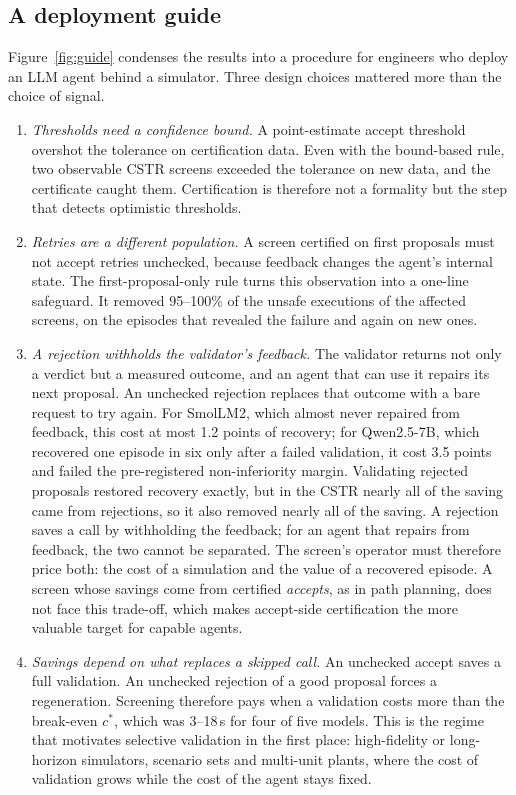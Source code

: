 \subsection{A deployment guide}
Figure~\ref{fig:guide} condenses the results into a procedure for engineers who deploy an LLM agent behind a
simulator. Three design choices mattered more than the choice of signal.
\begin{enumerate}
\item \emph{Thresholds need a confidence bound.} A point-estimate accept threshold overshot the tolerance on
certification data. Even with the bound-based rule, two observable CSTR screens exceeded the tolerance on new
data, and the certificate caught them. Certification is therefore not a formality but the step that detects
optimistic thresholds.
\item \emph{Retries are a different population.} A screen certified on first proposals must not accept retries
unchecked, because feedback changes the agent's internal state. The first-proposal-only rule turns this
observation into a one-line safeguard. It removed 95--100\% of the unsafe executions of the affected screens,
on the episodes that revealed the failure and again on new ones.
\item \emph{A rejection withholds the validator's feedback.} The validator returns not only a verdict but a measured
outcome, and an agent that can use it repairs its next proposal. An unchecked rejection replaces that outcome with
a bare request to try again. For SmolLM2, which almost never repaired from feedback, this cost at most 1.2 points
of recovery; for Qwen2.5-7B, which recovered one episode in six only after a failed validation, it cost 3.5 points
and failed the pre-registered non-inferiority margin. Validating rejected proposals restored recovery exactly, but
in the CSTR nearly all of the saving came from rejections, so it also removed nearly all of the saving. A rejection
saves a call by withholding the feedback; for an agent that repairs from feedback, the two cannot be separated. The
screen's operator must therefore price both: the cost of a simulation and the value of a recovered episode. A
screen whose savings come from certified \emph{accepts}, as in path planning, does not face this trade-off, which
makes accept-side certification the more valuable target for capable agents.
\item \emph{Savings depend on what replaces a skipped call.} An unchecked accept saves a full validation. An
unchecked rejection of a good proposal forces a regeneration. Screening therefore pays when a validation costs
more than the break-even $c^{\ast}$, which was 3--18\,s for four of five models. This is the regime that motivates
selective validation in the first place: high-fidelity or long-horizon simulators, scenario sets and multi-unit
plants, where the cost of validation grows while the cost of the agent stays fixed.
\end{enumerate}

